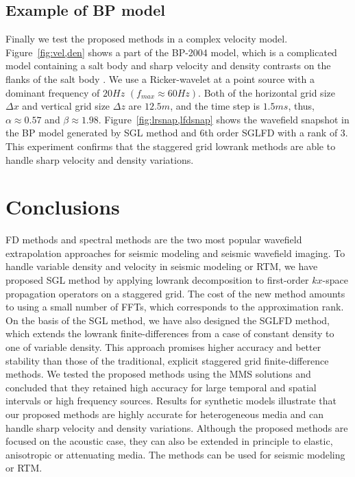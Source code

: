 

\subsection{Example of BP model}

Finally we test the proposed methods in a complex velocity model. Figure~\ref{fig:vel,den} shows a part of the BP-2004 model, which is a complicated model containing a salt body and sharp velocity and density contrasts on the flanks of the salt body \cite[]{bp2004}. We use a Ricker-wavelet at a point source with a dominant frequency of $20 Hz$ $(f_{max} \approx 60Hz)$. Both of the horizontal grid size $\Delta x$ and vertical grid size $\Delta z$ are $12.5m$, and the time step is $1.5ms$, thus, $\alpha \approx 0.57$ and $\beta \approx 1.98$. Figure~\ref{fig:lrsnap,lfdsnap} shows the wavefield snapshot in the BP model generated by SGL method and 6th order SGLFD with a rank of 3. This experiment confirms that the staggered grid lowrank methods are able to handle sharp velocity and density variations.   




\section{Conclusions}
FD methods and spectral methods are the two most popular wavefield extrapolation approaches for seismic modeling and seismic wavefield imaging. To handle variable density and velocity in seismic modeling or RTM, we have proposed SGL method by applying lowrank decomposition to first-order $kx$-space propagation operators on a staggered grid. The cost of the new method amounts to using a small number of FFTs, which corresponds to the approximation rank. On the basis of the SGL method, we have also designed the SGLFD method, which extends the lowrank finite-differences from a case of constant density to one of variable density. This approach promises higher accuracy and better stability than those of the traditional, explicit staggered grid finite-difference methods. We tested the proposed methods using the MMS solutions and concluded that they retained high accuracy for large temporal and spatial intervals or high frequency sources. Results for synthetic models illustrate that our proposed methods are highly accurate for heterogeneous media and can handle sharp velocity and density variations. Although the proposed methods are focused on the acoustic case, they can also be extended in principle to elastic, anisotropic or attenuating media. The methods can be used for seismic modeling or RTM.  



